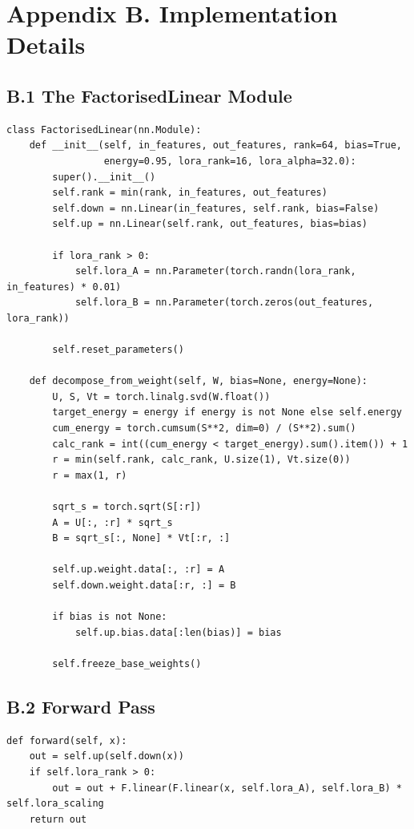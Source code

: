 \section{Appendix B. Implementation Details}

\subsection{B.1 The FactorisedLinear Module}

\begin{lstlisting}
class FactorisedLinear(nn.Module):
    def __init__(self, in_features, out_features, rank=64, bias=True,
                 energy=0.95, lora_rank=16, lora_alpha=32.0):
        super().__init__()
        self.rank = min(rank, in_features, out_features)
        self.down = nn.Linear(in_features, self.rank, bias=False)
        self.up = nn.Linear(self.rank, out_features, bias=bias)
        
        if lora_rank > 0:
            self.lora_A = nn.Parameter(torch.randn(lora_rank, in_features) * 0.01)
            self.lora_B = nn.Parameter(torch.zeros(out_features, lora_rank))
        
        self.reset_parameters()
    
    def decompose_from_weight(self, W, bias=None, energy=None):
        U, S, Vt = torch.linalg.svd(W.float())
        target_energy = energy if energy is not None else self.energy
        cum_energy = torch.cumsum(S**2, dim=0) / (S**2).sum()
        calc_rank = int((cum_energy < target_energy).sum().item()) + 1
        r = min(self.rank, calc_rank, U.size(1), Vt.size(0))
        r = max(1, r)
        
        sqrt_s = torch.sqrt(S[:r])
        A = U[:, :r] * sqrt_s
        B = sqrt_s[:, None] * Vt[:r, :]
        
        self.up.weight.data[:, :r] = A
        self.down.weight.data[:r, :] = B
        
        if bias is not None:
            self.up.bias.data[:len(bias)] = bias
        
        self.freeze_base_weights()
\end{lstlisting}

\subsection{B.2 Forward Pass}

\begin{lstlisting}
def forward(self, x):
    out = self.up(self.down(x))
    if self.lora_rank > 0:
        out = out + F.linear(F.linear(x, self.lora_A), self.lora_B) * self.lora_scaling
    return out
\end{lstlisting}

